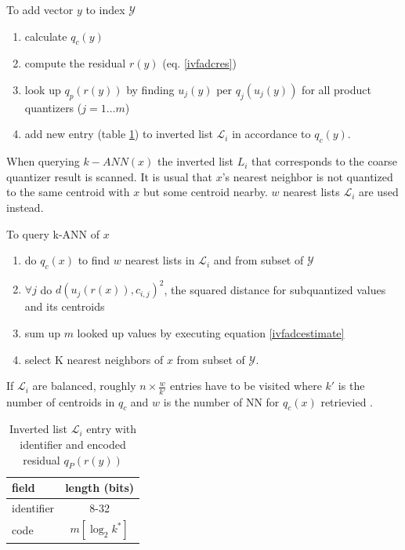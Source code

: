 \documentclass[english,12pt,a4paper,pdftex,elec,utf8]{aaltothesis}
\begin{document}
To add vector $y$ to index $\mathcal{Y}$
\begin{enumerate}
\item calculate $q_c(y)$
\item compute the residual $r(y)$ (eq. \ref{ivfadcres})
\item look up $q_p(r(y))$ by finding $u_j(y)$ per $q_j(u_j(y))$ for all product quantizers ($j = 1 \ldots m$)
\item add new entry (table \ref{ivfadcentry}) to inverted list $\mathcal{L}_i$ in accordance to $q_c(y)$.
\end{enumerate}

When querying $k-ANN(x)$ the inverted list $L_i$ that corresponds to the coarse quantizer result is scanned. It is usual that $x$'s nearest neighbor is not quantized to the same centroid with $x$ but some centroid nearby. $w$ nearest lists $\mathcal{L}_i$ are used instead. \cite{Jegou2008}


To query k-ANN of $x$
\begin{enumerate}
\item do $q_c(x)$ to find $w$ nearest lists in $\mathcal{L}_i$ and from subset of $\mathcal{Y}$
\item $\forall j$ do $d(u_j(r(x)), c_{i,j})^2$, the squared distance for subquantized values and its centroids
\item sum up $m$ looked up values by executing equation \ref{ivfadcestimate}
  \item select K nearest neighbors of $x$ from subset of $\mathcal{Y}$.
\end{enumerate}
\cite{Jegou2008}

If $\mathcal{L}_i$ are balanced, roughly $n \times \frac{w}{k'}$ entries have to be visited where $k'$ is the number of centroids in $q_c$ and $w$ is the number of NN for $q_c(x)$ retrievied \cite{Jegou2008}.

\def\arraystretch{1.5}
\begin{table}[htb]
\caption{Inverted list $\mathcal{L}_i$ entry with identifier and encoded residual $q_P(r(y))$ \cite{Jegou2008}}
\label{ivfadcentry}
\begin{center}
\begin{tabular}{lc}
  field & length (bits)\\
  \hline
  identifier&8-32\\
  code & $m[\log_2k^*]$\\
\end{tabular}
\end{center}\end{table}
\end{document}
